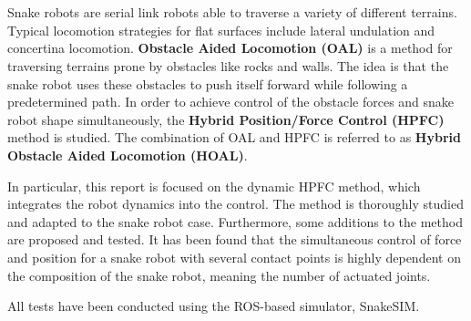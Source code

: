 \chapter{\abstractname}


Snake robots are serial link robots able to traverse a variety of different terrains. Typical locomotion strategies for flat surfaces include lateral undulation and concertina locomotion. \textbf{Obstacle Aided Locomotion (OAL)} is a method for traversing terrains prone by obstacles like rocks and walls. The idea is that the snake robot uses these obstacles to push itself forward while following a predetermined path. In order to achieve control of the obstacle forces and snake robot shape simultaneously, the \textbf{Hybrid Position/Force Control (HPFC)} method is studied. The combination of OAL and HPFC is referred to as \textbf{Hybrid Obstacle Aided Locomotion (HOAL)}.

In particular, this report is focused on the dynamic HPFC method, which integrates the robot dynamics into the control. The method is thoroughly studied and adapted to the snake robot case. Furthermore, some additions to the method are proposed and tested. It has been found that the simultaneous control of force and position for a snake robot with several contact points is highly dependent on the composition of the snake robot, meaning the number of actuated joints.

All tests have been conducted using the ROS-based simulator, SnakeSIM.


\makeatletter
{}


\makeatother







